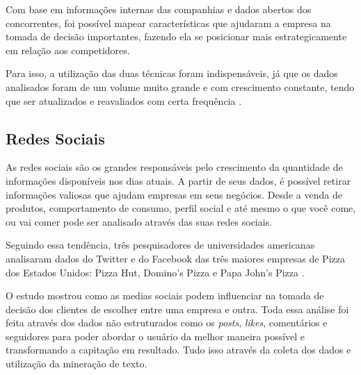 \documentclass[conference]{IEEEtran}
\begin{document}
Com base em informações internas das companhias e dados abertos dos concorrentes, foi possível mapear características que ajudaram a empresa na tomada de decisão importantes, fazendo ela se posicionar mais estrategicamente em relação aos competidores.

Para isso, a utilização das duas técnicas foram indispensáveis, já que os dados analisados foram de um volume muito grande e com crescimento constante, tendo que ser atualizados e reavaliados com certa frequência \cite{art7}.

\subsection{Redes Sociais}
As redes sociais são os grandes responsáveis pelo crescimento da quantidade de informações disponíveis nos dias atuais. A partir de seus dados, é possível retirar informações valiosas que ajudam empresas em seus negócios. Desde a venda de produtos, comportamento de consumo, perfil social e até mesmo o que você come, ou vai comer pode ser analisado através das suas redes sociais.

Seguindo essa tendência, três pesquisadores de universidades americanas analisaram dados do Twitter e do Facebook das três maiores empresas de Pizza dos Estados Unidos: Pizza Hut, Domino's Pizza e Papa John's Pizza \cite{art11}.

O estudo mostrou como as medias sociais podem influenciar na tomada de decisão dos clientes de escolher entre uma empresa e outra. Toda essa análise foi feita através dos dados não estruturados como os \textit{posts}, \textit{likes}, comentários e seguidores para poder abordar o usuário da melhor maneira possível e transformando a capitação em resultado.  Tudo isso através da coleta dos dados e utilização da mineração de texto.




\end{document}
